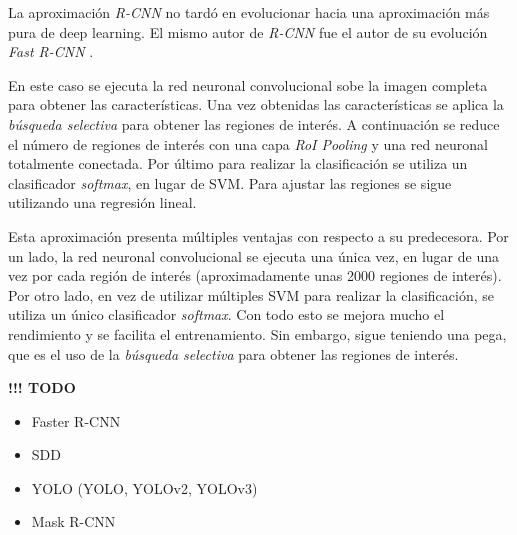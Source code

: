 La aproximación \textit{R-CNN} no tardó en evolucionar hacia una aproximación más pura de deep learning. El mismo autor de \textit{R-CNN} fue el autor de su evolución \textit{Fast R-CNN} \cite{s2_stateofart8}.

En este caso se ejecuta la red neuronal convolucional sobe la imagen completa para obtener las características. Una vez obtenidas las características se aplica la \textit{búsqueda selectiva} para obtener las regiones de interés. A continuación se reduce el número de regiones de interés con una capa \textit{RoI Pooling} y una red neuronal totalmente conectada. Por último para realizar la clasificación se utiliza un clasificador \textit{softmax}, en lugar de SVM. Para ajustar las regiones se sigue utilizando una regresión lineal.

Esta aproximación presenta múltiples ventajas con respecto a su predecesora. Por un lado, la red neuronal convolucional se ejecuta una única vez, en lugar de una vez por cada región de interés (aproximadamente unas 2000 regiones de interés). Por otro lado, en vez de utilizar múltiples SVM para realizar la clasificación, se utiliza un único clasificador \textit{softmax}. Con todo esto se mejora mucho el rendimiento y se facilita el entrenamiento. Sin embargo, sigue teniendo una pega, que es el uso de la \textit{búsqueda selectiva} para obtener las regiones de interés.

{\color{red} \textbf{!!! TODO}}

\begin{itemize}
	\item Faster R-CNN
	\item SDD
	\item YOLO (YOLO, YOLOv2, YOLOv3)
	\item Mask R-CNN
\end{itemize}